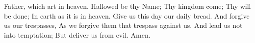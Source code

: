  Father, which art in heaven, Hallowed be thy Name; Thy kingdom come; Thy will be done; In earth as it is in heaven. Give us this day our daily bread. And forgive us our trespasses, As we forgive them that trespass against us. And lead us not into temptation; But deliver us from evil. Amen.
